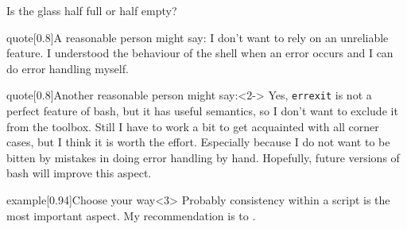 \begin{frame}{Is the glass half full or half empty?}
    \vspace{-1mm}
    \begin{varblock}{quote}[0.8\textwidth]{A reasonable person might say:}
        I don't want to rely on an unreliable feature.
        I understood the behaviour of the shell when an error occurs and I can do error handling myself.
    \end{varblock}
    \begin{varblock}{quote}[0.8\textwidth]{Another reasonable person might say:}<2->
        Yes, \texttt{errexit} is not a perfect feature of bash, but it has useful semantics, so I don't want to exclude it from the toolbox.
        Still I have to work a bit to get acquainted with all corner cases, but I think it is worth the effort.
        Especially because I do not want to be bitten by mistakes in doing error handling by hand.
        Hopefully, future versions of bash will improve this aspect.
    \end{varblock}
    \begin{varblock}{example}[0.94\textwidth]{Choose your way}<3>
        Probably consistency within a script is the most important aspect.
        My recommendation is to .
    \end{varblock}
\end{frame}
